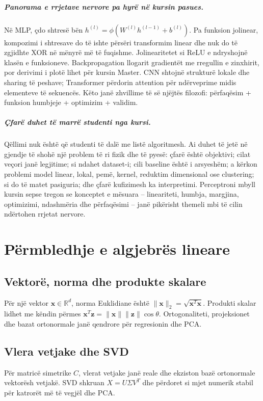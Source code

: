 \documentclass[12pt,a4paper,oneside]{book}
\newcommand{\R}{\mathbb{R}}
\begin{document}
\paragraph{Panorama e rrjetave nervore pa hyrë në kursin pasues.}
Në MLP, çdo shtresë bën $h^{(l)}=\phi(W^{(l)}h^{(l-1)}+b^{(l)})$. Pa funksion jolinear, kompozimi i shtresave do të ishte përsëri transformim linear dhe nuk do të zgjidhte XOR në mënyrë më të fuqishme. Jolinearitetet si ReLU e ndryshojnë klasën e funksioneve. Backpropagation llogarit gradientët me rregullin e zinxhirit, por derivimi i plotë lihet për kursin Master. CNN shtojnë strukturë lokale dhe sharing të peshave; Transformer përdorin attention për ndërveprime midis elementeve të sekuencës. Këto janë zhvillime të së njëjtës filozofi: përfaqësim + funksion humbjeje + optimizim + validim.

\paragraph{Çfarë duhet të marrë studenti nga kursi.}
Qëllimi nuk është që studenti të dalë me listë algoritmesh. Ai duhet të jetë në gjendje të shohë një problem të ri fizik dhe të pyesë: çfarë është objektivi; cilat veçori janë legjitime; si ndahet dataset-i; cili baseline është i arsyeshëm; a kërkon problemi model linear, lokal, pemë, kernel, reduktim dimensional ose clustering; si do të matet pasiguria; dhe çfarë kufizimesh ka interpretimi. Perceptroni mbyll kursin sepse tregon se konceptet e mësuara -- lineariteti, humbja, margjina, optimizimi, ndashmëria dhe përfaqësimi -- janë pikërisht themeli mbi të cilin ndërtohen rrjetat nervore.

\appendix
\chapter[Algjebër lineare]{Përmbledhje e algjebrës lineare}
\section{Vektorë, norma dhe produkte skalare}
Për një vektor $\mathbf x\in\R^d$, norma Euklidiane është $\|\mathbf x\|_2=\sqrt{\mathbf x^T\mathbf x}$. Produkti skalar lidhet me këndin përmes $\mathbf x^T\mathbf z=\|\mathbf x\|\|\mathbf z\|\cos\theta$. Ortogonaliteti, projeksionet dhe bazat ortonormale janë qendrore për regresionin dhe PCA.
\section{Vlera vetjake dhe SVD}
Për matricë simetrike $C$, vlerat vetjake janë reale dhe ekziston bazë ortonormale vektorësh vetjakë. SVD shkruan $X=U\Sigma V^T$ dhe përdoret si mjet numerik stabil për katrorët më të vegjël dhe PCA.
\end{document}
